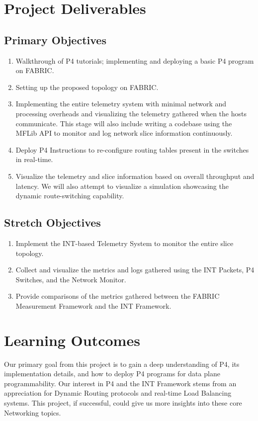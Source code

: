 \documentclass[conference]{IEEEtran}
\begin{document}
\section{Project Deliverables}
\subsection{Primary Objectives}
\begin{enumerate}
\item Walkthrough of P4 tutorials; implementing and deploying a basic P4 program on FABRIC.
\item Setting up the proposed topology on FABRIC. 
\item Implementing the entire telemetry system with minimal network and processing overheads and visualizing the telemetry gathered when the hosts communicate. This stage will also include writing a codebase using the MFLib API to monitor and log network slice information continuously.
\item Deploy P4 Instructions to re-configure routing tables present in the switches in real-time.
\item Visualize the telemetry and slice information based on overall throughput and latency. We will also attempt to visualize a simulation showcasing the dynamic route-switching capability.
\end{enumerate}
\subsection{Stretch Objectives}
\begin{enumerate}
\item Implement the INT-based Telemetry System to monitor the entire slice topology.
\item Collect and visualize the metrics and logs gathered using the INT Packets, P4 Switches, and the Network Monitor.
\item Provide comparisons of the metrics gathered between the FABRIC Measurement Framework and the INT Framework. 
\end{enumerate}

\section{Learning Outcomes}
Our primary goal from this project is to gain a deep understanding of P4, its implementation details, and how to deploy P4 programs for data plane programmability. Our interest in P4 and the INT Framework stems from an appreciation for Dynamic Routing protocols and real-time Load Balancing systems. This project, if successful, could give us more insights into these core Networking topics.
\end{document}
